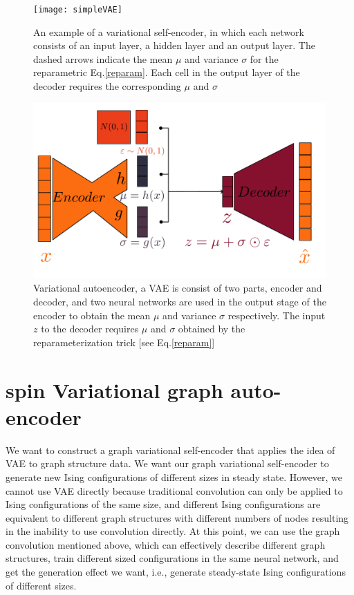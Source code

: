 \documentclass[%
reprint,
amsmath,amssymb,
aps,
]{revtex4-2}
\begin{document}
\begin{figure}
	\centering
	\texttt{[image: simpleVAE]}
			\caption{An example of a variational self-encoder, in which each network consists of an input layer, a hidden layer and an output layer. The dashed arrows indicate the mean $\mu$ and variance $\sigma$ for the reparametric Eq.\ref{reparam}. Each cell in the output layer of the decoder requires the corresponding $\mu$ and $\sigma$}
	\label{fig:simplevae}
\end{figure}
	
	
	\begin{figure}[b]
		\includegraphics[scale=0.3]{vae}
		\caption{Variational autoencoder, a VAE is consist of two parts, encoder and decoder, and two neural networks are used in the output stage of the encoder to obtain the mean $\mu$ and variance $\sigma$ respectively. The input $z$ to the decoder requires $\mu$ and $\sigma$ obtained by the reparameterization trick [see Eq.\ref{reparam}]}
		\label{fig:vae}
	\end{figure}
	
	\section{spin Variational graph auto-encoder}
	We want to construct a graph variational self-encoder that applies the idea of VAE to graph structure data. We want our graph variational self-encoder to generate new Ising configurations of different sizes in steady state. However, we cannot use VAE directly because traditional convolution can only be applied to Ising configurations of the same size, and different Ising configurations are equivalent to different graph structures with different numbers of nodes resulting in the inability to use convolution directly. At this point, we can use the graph convolution mentioned above, which can effectively describe different graph structures, train different sized configurations in the same neural network, and get the generation effect we want, i.e., generate steady-state Ising configurations of different sizes.	
\end{document}
